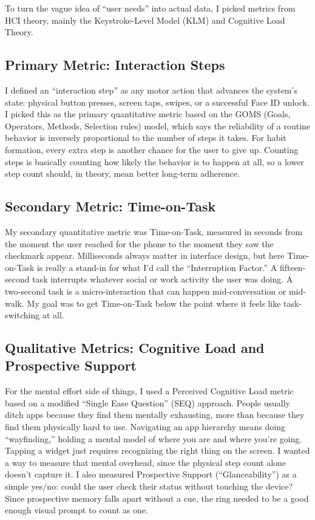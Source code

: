 \documentclass[10pt,twocolumn]{article}
\begin{document}
To turn the vague idea of ``user needs'' into actual data, I picked metrics from HCI theory, mainly the Keystroke-Level Model (KLM) and Cognitive Load Theory.\cite{CardKeystrokeModel}

\subsection{Primary Metric: Interaction Steps}

I defined an ``interaction step'' as any motor action that advances the system's state: physical button presses, screen taps, swipes, or a successful Face ID unlock. I picked this as the primary quantitative metric based on the GOMS (Goals, Operators, Methods, Selection rules) model, which says the reliability of a routine behavior is inversely proportional to the number of steps it takes. For habit formation, every extra step is another chance for the user to give up. Counting steps is basically counting how likely the behavior is to happen at all, so a lower step count should, in theory, mean better long-term adherence.

\subsection{Secondary Metric: Time-on-Task}

My secondary quantitative metric was Time-on-Task, measured in seconds from the moment the user reached for the phone to the moment they saw the checkmark appear. Milliseconds always matter in interface design, but here Time-on-Task is really a stand-in for what I'd call the ``Interruption Factor.'' A fifteen-second task interrupts whatever social or work activity the user was doing. A two-second task is a micro-interaction that can happen mid-conversation or mid-walk. My goal was to get Time-on-Task below the point where it feels like task-switching at all.

\subsection{Qualitative Metrics: Cognitive Load and Prospective Support}

For the mental effort side of things, I used a Perceived Cognitive Load metric based on a modified ``Single Ease Question'' (SEQ) approach. People usually ditch apps because they find them mentally exhausting, more than because they find them physically hard to use.\cite{AppleHIGWidgets} Navigating an app hierarchy means doing ``wayfinding,'' holding a mental model of where you are and where you're going. Tapping a widget just requires recognizing the right thing on the screen. I wanted a way to measure that mental overhead, since the physical step count alone doesn't capture it. I also measured Prospective Support (``Glanceability'') as a simple yes/no: could the user check their status without touching the device? Since prospective memory falls apart without a cue, the ring needed to be a good enough visual prompt to count as one.
\end{document}
